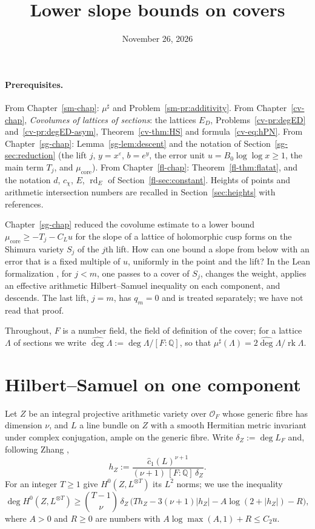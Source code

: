 \documentclass[reqno]{amsart}
\title{Lower slope bounds on covers}
\author{}
\date{November 26, 2026}
\newcounter{chap}
\theoremstyle{definition}
\theoremstyle{plain}
\theoremstyle{remark}
\newcommand{\Q}{\mathbb Q}
\newcommand{\Oc}{\mathcal O}
\newcommand{\rk}{\operatorname{rk}}
\newcommand{\mus}{\mu^\sharp}
\newcommand{\dg}{\widehat{\deg}}
\newcommand{\cc}{\hat{c}_1}
\newcommand{\rd}{\operatorname{rd}}
\begin{document}
\maketitle
{}\label{chap}

\paragraph{Prerequisites.}
From Chapter~\ref{sm-chap}: \(\mus\) and Problem~\ref{sm-pr:additivity}.  From Chapter~\ref{cv-chap}, \emph{Covolumes of lattices of sections}: the lattices \(E_D\), Problems~\ref{cv-pr:degED} and~\ref{cv-pr:degED-asym}, Theorem~\ref{cv-thm:HS} and formula~\eqref{cv-eq:hPN}.  From Chapter~\ref{sg-chap}: Lemma~\ref{sg-lem:descent} and the notation of Section~\ref{sg-sec:reduction} (the lift \(j\), \(y = x^\varepsilon\), \(b = e^y\), the error unit \(u = B_0\log\log x \ge 1\), the main term \(T_j\), and \(\mu_{\mathrm{core}}\)).  From Chapter~\ref{fl-chap}: Theorem~\ref{fl-thm:flatat}, and the notation \(d\), \(c_\chi\), \(E\), \(\rd_E\) of Section~\ref{fl-sec:constant}.  Heights of points and arithmetic intersection numbers are recalled in Section~\ref{sec:heights} with references.

Chapter~\ref{sg-chap} reduced the covolume estimate to a lower bound \(\mu_{\mathrm{core}} \ge -T_j - C_Lu\) for the slope of a lattice of holomorphic cusp forms on the Shimura variety \(S_j\) of the \(j\)th lift.  How can one bound a slope from below with an error that is a fixed multiple of \(u\), uniformly in the point and the lift?  In the Lean formalization \cite{Lean}, for \(j < m\), one passes to a cover of \(S_j\), changes the weight, applies an effective arithmetic Hilbert--Samuel inequality on each component, and descends.  The last lift, \(j = m\), has \(q_m = 0\) and is treated separately; we have not read that proof.

Throughout, \(F\) is a number field, the field of definition of the cover; for a lattice \(\Lambda\) of sections we write \(\dg\Lambda := \deg\Lambda/[F:\Q]\), so that \(\mus(\Lambda) = 2\dg\Lambda/\rk\Lambda\).

\section{Hilbert--Samuel on one component}\label{sec:hs}

Let \(Z\) be an integral projective arithmetic variety over \(\Oc_F\) whose generic fibre has dimension \(\nu\), and \(L\) a line bundle on \(Z\) with a smooth Hermitian metric invariant under complex conjugation, ample on the generic fibre.  Write \(\delta_Z := \deg L_F\) and, following Zhang \cite{Zha},
\[
  h_Z := \frac{\cc(L)^{\nu+1}}{(\nu+1)\,[F:\Q]\,\delta_Z} .
\]
For an integer \(T \ge 1\) give \(H^0(Z, L^{\otimes T})\) its \(L^2\) norms; we use the inequality
\begin{equation}\label{eq:hs}
  \dg H^0(Z, L^{\otimes T}) \ge \binom{T-1}{\nu}\,\delta_Z\,\bigl(Th_Z - 3(\nu+1)\lvert h_Z\rvert - A\log(2 + \lvert h_Z\rvert) - R\bigr) ,
\end{equation}
where \(A > 0\) and \(R \ge 0\) are numbers with \(A\log\max(A,1) + R \le C_2u\).
\end{document}
